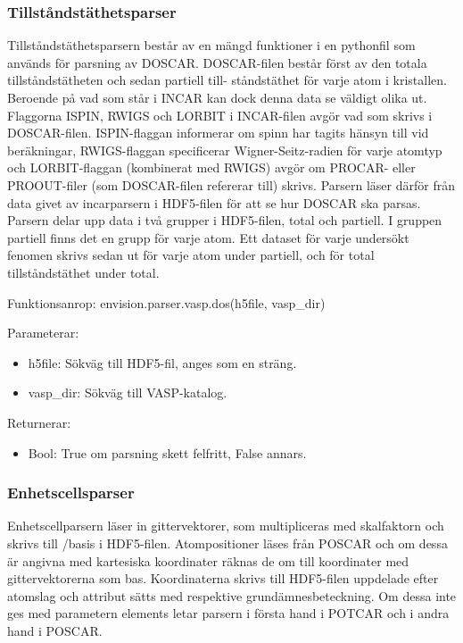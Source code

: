\subsubsection{Tillståndstäthetsparser}
Tillståndstäthetsparsern består av en mängd funktioner i en pythonfil som används för parsning av DOSCAR. DOSCAR-filen består först av den totala tillståndstätheten och sedan partiell till- ståndstäthet för varje atom i kristallen. Beroende på vad som står i INCAR kan dock denna data se väldigt olika ut. Flaggorna ISPIN, RWIGS och LORBIT i INCAR-filen avgör vad som skrivs i DOSCAR-filen. ISPIN-flaggan informerar om spinn har tagits hänsyn till vid beräkningar, RWIGS-flaggan specificerar Wigner-Seitz-radien för varje atomtyp och LORBIT-flaggan (kombinerat med RWIGS) avgör om PROCAR- eller PROOUT-filer (som DOSCAR-filen refererar till) skrivs. Parsern läser därför från data givet av incarparsern i HDF5-filen för att se hur DOSCAR ska parsas. Parsern delar upp data i två grupper i HDF5-filen, total och partiell. I gruppen partiell finns det en grupp för varje atom. Ett dataset för varje undersökt fenomen skrivs sedan ut för varje atom under partiell, och för total tillståndstäthet under total.

Funktionsanrop: envision.parser.vasp.dos(h5file, vasp\_dir)

Parameterar: 
\begin{itemize}
    \setlength\itemsep{0em}
    \item h5file: Sökväg till HDF5-fil, anges som en sträng.
    \item vasp\_dir: Sökväg till VASP-katalog.      
\end{itemize}

Returnerar: 
\begin{itemize}
    \item Bool: True om parsning skett felfritt, False annars.
\end{itemize}

\subsubsection{Enhetscellsparser}
Enhetscellparsern läser in gittervektorer, som multipliceras med skalfaktorn och skrivs till /basis i HDF5-filen. Atompositioner läses från POSCAR och om dessa är angivna med kartesiska koordinater räknas de om till koordinater med gittervektorerna som bas. Koordinaterna skrivs till HDF5-filen uppdelade efter atomslag och attribut sätts med respektive grundämnesbeteckning. Om dessa inte ges med parametern elements letar parsern i första hand i POTCAR och i andra hand i POSCAR.

